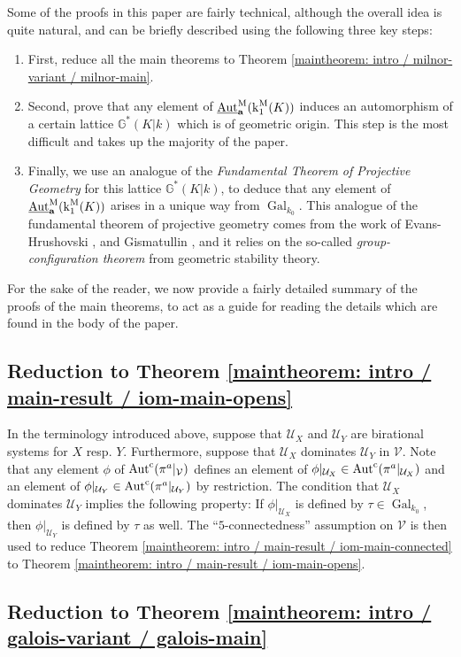 \documentclass[11pt]{amsart}
\theoremstyle{definition}
\theoremstyle{remark}
\numberwithin{equation}{section}
\DeclareMathOperator{\Aut}{Aut}
\DeclareMathOperator{\Gal}{Gal}
\newcommand{\Gbb}{\mathbb{G}}
\newcommand{\Vc}{\mathcal{V}}
\newcommand{\Ucal}{\mathcal{U}}
\newcommand{\abf}{\mathbf{a}}
\newcommand{\Autc}{\Aut^{\rm c}}
\newcommand{\UAutm}{\underline{\Aut}^{\rm M}}
\renewcommand{\k}{\operatorname{k}^{\rm M}}
\newcommand{\Galk}{{\Gal_{k_0}}}
\begin{document}
Some of the proofs in this paper are fairly technical, although the overall idea is quite natural, and can be briefly described using the following three key steps:
\begin{enumerate}
  \item First, reduce all the main theorems to Theorem \ref{maintheorem: intro / milnor-variant / milnor-main}.
  \item Second, prove that any element of $\UAutm_\abf(\k_1(K))$ induces an automorphism of a certain lattice $\Gbb^*(K|k)$ which is of geometric origin. This step is the most difficult and takes up the majority of the paper.
  \item Finally, we use an analogue of the \emph{Fundamental Theorem of Projective Geometry} for this lattice $\Gbb^*(K|k)$, to deduce that any element of $\UAutm_\abf(\k_1(K))$ arises in a unique way from $\Galk$.
  This analogue of the fundamental theorem of projective geometry comes from the work of {\sc Evans-Hrushovski} \cite{Evans:1991}, \cite{Evans:1995} and {\sc Gismatullin} \cite{Gismatullin:2008}, and it relies on the so-called \emph{group-configuration theorem} from geometric stability theory.
\end{enumerate}
For the sake of the reader, we now provide a fairly detailed summary of the proofs of the main theorems, to act as a guide for reading the details which are found in the body of the paper.

\subsection{Reduction to Theorem \ref{maintheorem: intro / main-result / iom-main-opens}}

In the terminology introduced above, suppose that $\Ucal_X$ and $\Ucal_Y$ are birational systems for $X$ resp. $Y$.
Furthermore, suppose that $\Ucal_X$ dominates $\Ucal_Y$ in $\Vc$.
Note that any element $\phi$ of $\Autc(\pi^a|_\Vc)$ defines an element of $\phi|_{\Ucal_X} \in \Autc(\pi^a|_{\Ucal_X})$ and an element of $\phi|_{\Ucal_Y} \in \Autc(\pi^a|_{\Ucal_Y})$ by restriction.
The condition that $\Ucal_X$ dominates $\Ucal_Y$ implies the following property: If $\phi|_{\Ucal_X}$ is defined by $\tau \in \Galk$, then $\phi|_{\Ucal_Y}$ is defined by $\tau$ as well.
The ``$5$-connectedness'' assumption on $\Vc$ is then used to reduce Theorem \ref{maintheorem: intro / main-result / iom-main-connected} to Theorem \ref{maintheorem: intro / main-result / iom-main-opens}.

\subsection{Reduction to Theorem \ref{maintheorem: intro / galois-variant / galois-main}}
\end{document}
